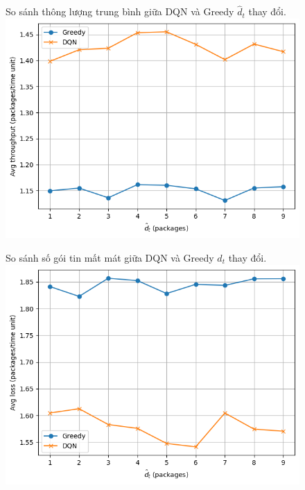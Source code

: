 \documentclass{uetgraduation}
\begin{document}
\begin{figure}{So sánh thông lượng trung bình giữa DQN và Greedy $\hat{d}_t$ thay đổi.}
    \centering
    \includegraphics[scale=0.8]{dt_throughput}
    \label{fig:dt_throughput}
\end{figure}
\begin{figure}{So sánh số gói tin mất mát giữa DQN và Greedy $\hat{d}_t$ thay đổi.}
    \centering
    \includegraphics[scale=0.8]{dt_loss}
    \label{fig:dt_loss}
\end{figure}
\end{document}
